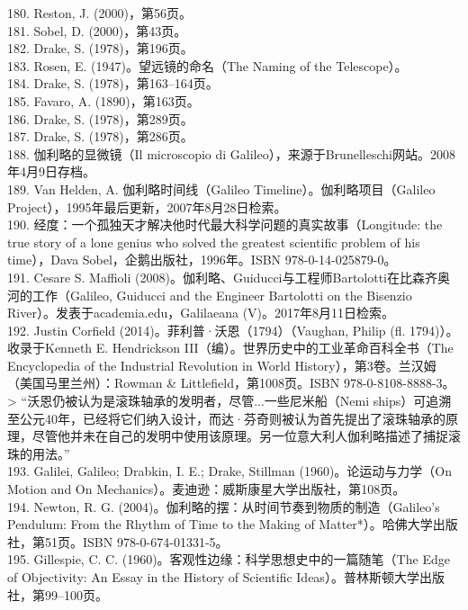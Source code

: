 180. Reston, J. (2000)，第56页。\\
181. Sobel, D. (2000)，第43页。\\
182. Drake, S. (1978)，第196页。\\
183. Rosen, E. (1947)。望远镜的命名（The Naming of the Telescope）。\\
184. Drake, S. (1978)，第163–164页。\\
185. Favaro, A. (1890)，第163页。\\
186. Drake, S. (1978)，第289页。\\
187. Drake, S. (1978)，第286页。\\
188. 伽利略的显微镜（Il microscopio di Galileo），来源于Brunelleschi网站。2008年4月9日存档。\\
189. Van Helden, A. 伽利略时间线（Galileo Timeline）。伽利略项目（Galileo Project），1995年最后更新，2007年8月28日检索。\\
190. 经度：一个孤独天才解决他时代最大科学问题的真实故事（Longitude: the true story of a lone genius who solved the greatest scientific problem of his time），Dava Sobel，企鹅出版社，1996年。ISBN 978-0-14-025879-0。\\
191. Cesare S. Maffioli (2008)。伽利略、Guiducci与工程师Bartolotti在比森齐奥河的工作（Galileo, Guiducci and the Engineer Bartolotti on the Bisenzio River）。发表于academia.edu，Galilaeana (V)。2017年8月11日检索。\\
192. Justin Corfield (2014)。菲利普·沃恩（1794）（Vaughan, Philip (fl. 1794)）。收录于Kenneth E. Hendrickson III（编）。世界历史中的工业革命百科全书（The Encyclopedia of the Industrial Revolution in World History），第3卷。兰汉姆（美国马里兰州）：Rowman & Littlefield，第1008页。ISBN 978-0-8108-8888-3。  
> “沃恩仍被认为是滚珠轴承的发明者，尽管...一些尼米船（Nemi ships）可追溯至公元40年，已经将它们纳入设计，而达·芬奇则被认为首先提出了滚珠轴承的原理，尽管他并未在自己的发明中使用该原理。另一位意大利人伽利略描述了捕捉滚珠的用法。”\\
193. Galilei, Galileo; Drabkin, I. E.; Drake, Stillman (1960)。论运动与力学（On Motion and On Mechanics）。麦迪逊：威斯康星大学出版社，第108页。\\
194. Newton, R. G. (2004)。伽利略的摆：从时间节奏到物质的制造（Galileo's Pendulum: From the Rhythm of Time to the Making of Matter*）。哈佛大学出版社，第51页。ISBN 978-0-674-01331-5。\\
195. Gillespie, C. C. (1960)。客观性边缘：科学思想史中的一篇随笔（The Edge of Objectivity: An Essay in the History of Scientific Ideas）。普林斯顿大学出版社，第99–100页。\\
